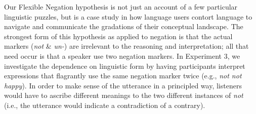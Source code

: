 \documentclass[floatsintext,doc]{apa6}
\newcommand{\ourmodel}{Flexible Negation\xspace}
\begin{document}


Our \ourmodel hypothesis is not just an account of a few particular linguistic puzzles, but is a case study in how language users contort language to navigate and communicate the gradations of their conceptual landscape.
The strongest form of this hypothesis as applied to negation is that the actual markers (\emph{not} \& \emph{un-}) are irrelevant to the reasoning and interpretation; all that need occur is that a speaker use two negation markers. 
In Experiment 3, we investigate the dependence on linguistic form by having participants interpret expressions that flagrantly use the same negation marker twice (e.g., \emph{not not happy}).
In order to make sense of the utterance in a principled way, listeners would have to ascribe different meanings to the two different instances of \emph{not} (i.e., the utterance would indicate a contradiction of a contrary). 
\end{document}
